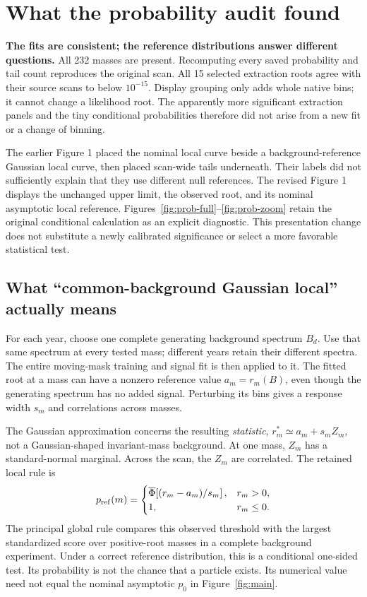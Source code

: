 \section{What the probability audit found}
\label{sec:prob-audit}
\textbf{The fits are consistent; the reference distributions answer different questions.} All 232 masses are present. Recomputing every saved probability and tail count reproduces the original scan. All 15 selected extraction roots agree with their source scans to below $10^{-15}$. Display grouping only adds whole native bins; it cannot change a likelihood root. The apparently more significant extraction panels and the tiny conditional probabilities therefore did not arise from a new fit or a change of binning.

The earlier Figure 1 placed the nominal local curve beside a background-reference Gaussian local curve, then placed scan-wide tails underneath. Their labels did not sufficiently explain that they use different null references. The revised Figure 1 displays the unchanged upper limit, the observed root, and its nominal asymptotic local reference. Figures~\ref{fig:prob-full}--\ref{fig:prob-zoom} retain the original conditional calculation as an explicit diagnostic. This presentation change does not substitute a newly calibrated significance or select a more favorable statistical test.

\subsection*{What ``common-background Gaussian local'' actually means}
For each year, choose one complete generating background spectrum $B_d$. Use that same spectrum at every tested mass; different years retain their different spectra. The entire moving-mask training and signal fit is then applied to it. The fitted root at a mass can have a nonzero reference value $a_m=r_m(B)$, even though the generating spectrum has no added signal. Perturbing its bins gives a response width $s_m$ and correlations across masses.

The Gaussian approximation concerns the resulting \emph{statistic}, $r_m^*\simeq a_m+s_m Z_m$, not a Gaussian-shaped invariant-mass background. At one mass, $Z_m$ has a standard-normal marginal. Across the scan, the $Z_m$ are correlated. The retained local rule is
\[
 p_{\rm ref}(m)=\begin{cases}
 \overline\Phi\!\left[(r_m-a_m)/s_m\right],&r_m>0,\\
 1,&r_m\leq0.
 \end{cases}
\]
The principal global rule compares this observed threshold with the largest standardized score over positive-root masses in a complete background experiment. Under a correct reference distribution, this is a conditional one-sided test. Its probability is not the chance that a particle exists. Its numerical value need not equal the nominal asymptotic $p_0$ in Figure~\ref{fig:main}.

